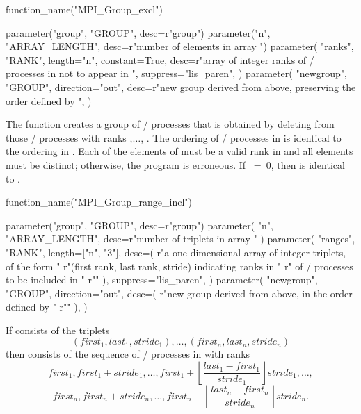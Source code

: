 %
\begin{mpi-binding}
    function_name("MPI_Group_excl")
    
    parameter("group", "GROUP", desc=r"group")
    parameter("n", "ARRAY_LENGTH", desc=r"number of elements in array ")
    parameter(
        "ranks",
        "RANK",
        length="n",
        constant=True,
        desc=r"array of integer ranks of \MPI/ processes in  not to appear in ",
        suppress="lis_paren",
    )
    parameter(
        "newgroup",
        "GROUP",
        direction="out",
        desc=r"new group derived from above, preserving the order defined by ",
    )
\end{mpi-binding}

The function  creates a group of \MPI/ processes
 that is obtained by deleting from 
those \MPI/ processes with ranks
,$\ldots$, .
The ordering of \MPI/ processes in  is identical to the ordering
in .
Each of the  elements of  must be a valid
rank in  and all elements must be distinct; otherwise, the
program is erroneous.
If $~=~0$, then  is identical to .

%
\begin{mpi-binding}
    function_name("MPI_Group_range_incl")
    
    parameter("group", "GROUP", desc=r"group")
    parameter(
        "n", "ARRAY_LENGTH", desc=r"number of triplets in array "
    )
    parameter(
        "ranges",
        "RANK",
        length=["n", "3"],
        desc=(
            r"a one-dimensional array of integer triplets, of the form "
            r"(first rank, last rank, stride) indicating ranks in "
            r" of \MPI/ processes to be included in "
            r""
        ),
        suppress="lis_paren",
    )
    parameter(
        "newgroup",
        "GROUP",
        direction="out",
        desc=(
            r"new group derived from above, in the order defined by "
            r""
        ),
    )
\end{mpi-binding}

\noindent If  consists of the triplets
\[
(first_1 , last_1, stride_1) , \ldots , (first_n, last_n, stride_n)
\]
then  consists of the sequence of
\MPI/ processes in  with ranks
\[
first_1 , first_1 + stride_1 , \ldots , first_1 + \left\lfloor \frac{last_1 -
first_1}{stride_1} \right\rfloor stride_1 , \ldots,
\]
\[
first_n , first_n + stride_n , \ldots , first_n + \left\lfloor \frac{last_n -
first_n}{stride_n} \right\rfloor stride_n .
\]

